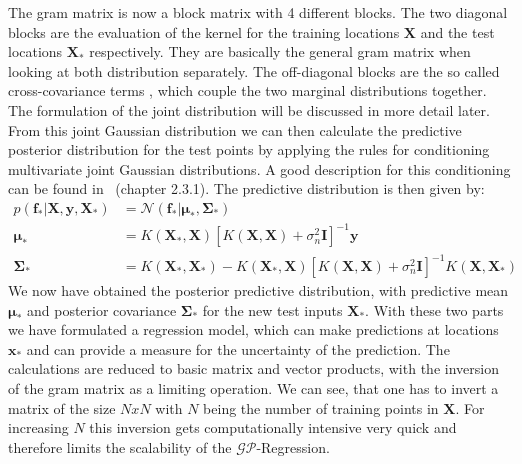 \documentclass{article}
\begin{document}
The gram matrix is now a block matrix with 4 different blocks. The two diagonal blocks are the evaluation of the kernel for the training locations $\bm{X}$ and the test locations $\bm{X_*}$ respectively. They are basically the general gram matrix when looking at both distribution separately. The off-diagonal blocks are the so called cross-covariance terms \cite{garnett_2023}, which couple the two marginal distributions together. The formulation of the joint distribution will be discussed in more detail later. From this joint Gaussian distribution we can then calculate the predictive posterior distribution for the test points by applying the rules for conditioning multivariate joint Gaussian distributions. A good description for this conditioning can be found in~\cite{bishop} (chapter 2.3.1). The predictive distribution is then given by:
\begin{equation}
    \begin{aligned}
        \label{eq:general_joint_gp}
        p(\bm{f_*}|\bm{X},\bm{y},\bm{X_*}) & = \mathcal{N}(\bm{f_*|\bm{\mu_*}},\bm{\Sigma_*})                                                           \\
        \bm{\mu_*}                         & =  K(\bm{X_*},\bm{X}){[K(\bm{X},\bm{X}) + \sigma_n^2 \bm{I}]}^{-1} \bm{y}                                  \\
        \bm{\Sigma_*}                      & = K(\bm{X_*},\bm{X_*}) - K(\bm{X_*},\bm{X}){[K(\bm{X},\bm{X}) + \sigma_n^2 \bm{I}]}^{-1}K(\bm{X},\bm{X_*})
    \end{aligned}
\end{equation}
We now have obtained the posterior predictive distribution, with predictive mean $\bm{\mu_*}$ and posterior covariance $\bm{\Sigma_*}$ for the new test inputs $\bm{X_*}$. With these two parts we have formulated a regression model, which can make predictions at locations $\bm{x_*}$ and can provide a measure for the uncertainty of the prediction. The calculations are reduced to basic matrix and vector products, with the inversion of the gram matrix as a limiting operation. We can see, that one has to invert a matrix of the size $NxN$ with $N$ being the number of training points in $\bm{X}$. For increasing $N$ this inversion gets computationally intensive very quick and therefore limits the scalability of the $\mathcal{GP}$-Regression.
\end{document}
